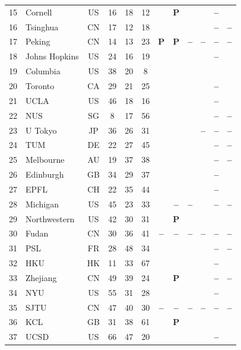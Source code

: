 \documentclass[pdflatex,sn-basic,Numbered,iicol]{sn-jnl}
\newcommand{\si}{\ding{51}}
\newcommand{\no}{\textcolor{gris}{\textbf{--}}}
\newcommand{\pc}{\textbf{P}}
\theoremstyle{thmstyleone}
\theoremstyle{thmstyletwo}
\theoremstyle{thmstylethree}
\begin{document}
\begin{appendices}
\begin{longtable}{@{}r l c c c c c c c c c c@{}}
			15 & Cornell & US & 16 & 18 & 12 & \si & \pc & \si & \si & \no & \si \\
			16 & Tsinghua & CN & 17 & 12 & 18 & \si & \si & \si & \si & \no & \no \\
			17 & Peking & CN & 14 & 13 & 23 & \pc & \pc & \no & \no & \no & \no \\
			18 & Johns Hopkins & US & 24 & 16 & 19 & \si & \si & \si & \si & \no & \si \\
			19 & Columbia & US & 38 & 20 & 8 & \si & \si & \si & \si & \si & \si \\
			20 & Toronto & CA & 29 & 21 & 25 & \si & \si & \si & \si & \no & \si \\
			21 & UCLA & US & 46 & 18 & 16 & \si & \si & \si & \si & \no & \si \\
			22 & NUS & SG & 8 & 17 & 56 & \si & \si & \si & \si & \no & \no \\
			23 & U Tokyo & JP & 36 & 26 & 31 & \si & \si & \si & \no & \no & \no \\
			24 & TUM & DE & 22 & 27 & 45 & \si & \si & \si & \si & \no & \no \\
			25 & Melbourne & AU & 19 & 37 & 38 & \si & \si & \si & \si & \no & \no \\
			26 & Edinburgh & GB & 34 & 29 & 37 & \si & \si & \si & \si & \no & \si \\
			27 & EPFL & CH & 22 & 35 & 44 & \si & \si & \si & \si & \no & \si \\
			28 & Michigan & US & 45 & 23 & 33 & \si & \no & \no & \si & \no & \no \\
			29 & Northwestern & US & 42 & 30 & 31 & \si & \pc & \si & \si & \si & \si \\
			30 & Fudan & CN & 30 & 36 & 41 & \no & \no & \no & \no & \no & \no \\
			31 & PSL & FR & 28 & 48 & 34 & \si & \si & \si & \si & \no & \no \\
			32 & HKU & HK & 11 & 33 & 67 & \si & \si & \si & \si & \no & \si \\
			33 & Zhejiang & CN & 49 & 39 & 24 & \si & \pc & \si & \si & \no & \no \\
			34 & NYU & US & 55 & 31 & 28 & \si & \si & \si & \si & \no & \si \\
			35 & SJTU & CN & 47 & 40 & 30 & \no & \no & \no & \no & \no & \no \\
			36 & KCL & GB & 31 & 38 & 61 & \si & \pc & \si & \si & \si & \si \\
			37 & UCSD & US & 66 & 47 & 20 & \si & \si & \si & \si & \no & \si \\

\end{longtable}
\end{appendices}
\end{document}
